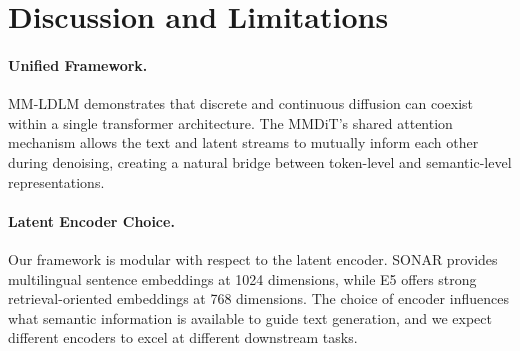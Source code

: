 \documentclass{article}
\begin{document}


\section{Discussion and Limitations}\label{sec:discussion}

\paragraph{Unified Framework.} MM-LDLM demonstrates that discrete and continuous diffusion can coexist within a single transformer architecture. The MMDiT's shared attention mechanism allows the text and latent streams to mutually inform each other during denoising, creating a natural bridge between token-level and semantic-level representations.

\paragraph{Latent Encoder Choice.} Our framework is modular with respect to the latent encoder. SONAR provides multilingual sentence embeddings at 1024 dimensions, while E5 offers strong retrieval-oriented embeddings at 768 dimensions. The choice of encoder influences what semantic information is available to guide text generation, and we expect different encoders to excel at different downstream tasks.
\end{document}

